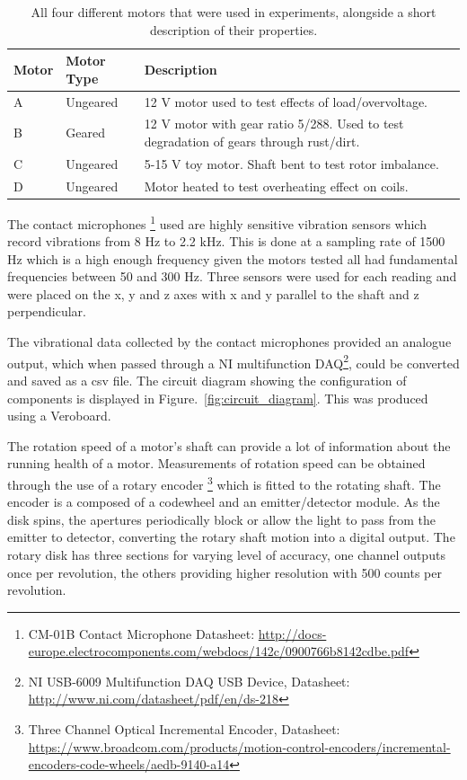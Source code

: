 \begin{table}[]
    \centering
    \begin{tabular}{|p{1cm}|p{1cm}|p{10cm}|}
    \hline
    \textbf{Motor}          & \textbf{Motor Type}        & \textbf{Description}                                                                          \\ \hline
    \multicolumn{1}{|l|}{A} & \multicolumn{1}{l|}{Ungeared} & 12 V motor used to test effects of load/overvoltage.                            \\
    \multicolumn{1}{|l|}{B} & \multicolumn{1}{l|}{Geared} & 12 V motor with gear ratio 5/288. Used to test degradation of gears through rust/dirt. \\
    \multicolumn{1}{|l|}{C} & \multicolumn{1}{l|}{Ungeared} & 5-15 V toy motor. Shaft bent to test rotor imbalance.                                \\
    \multicolumn{1}{|l|}{D} & \multicolumn{1}{l|}{Ungeared}   & Motor heated to test overheating effect on coils.                          \\ \hline
    \end{tabular}
    \caption[Motor Descriptions]{All four different motors that were used in experiments, alongside a short description of their properties.}
    \label{motor_table}
\end{table}

The contact microphones \footnote{CM-01B Contact Microphone Datasheet: \url{http://docs-europe.electrocomponents.com/webdocs/142c/0900766b8142cdbe.pdf}} used are highly sensitive vibration sensors which record vibrations from 8 Hz to 2.2 kHz. This is done at a sampling rate of 1500 Hz which is a high enough frequency given the motors tested all had fundamental frequencies between 50 and 300 Hz. Three sensors were used for each reading and were placed on the x, y and z axes with x and y parallel to the shaft and z perpendicular. 

The vibrational data collected by the contact microphones provided an analogue output, which when passed through a NI multifunction DAQ\footnote{NI USB-6009  Multifunction DAQ USB Device, Datasheet: \url{http://www.ni.com/datasheet/pdf/en/ds-218}}, could be converted and saved as a csv file. The circuit diagram showing the configuration of components is displayed in Figure.~\ref{fig:circuit_diagram}. This was produced using a Veroboard.

The rotation speed of a motor's shaft can provide a lot of information about the running health of a motor. Measurements of rotation speed can be obtained through the use of a rotary encoder \footnote{Three Channel Optical Incremental Encoder, Datasheet: \url{https://www.broadcom.com/products/motion-control-encoders/incremental-encoders-code-wheels/aedb-9140-a14}} which is fitted to the rotating shaft. The encoder is a composed of a codewheel and an emitter/detector module. As the disk spins, the apertures periodically block or allow the light to pass from the emitter to detector, converting the rotary shaft motion into a digital output. The rotary disk has three sections for varying level of accuracy, one channel outputs once per revolution, the others providing higher resolution with 500 counts per revolution.

